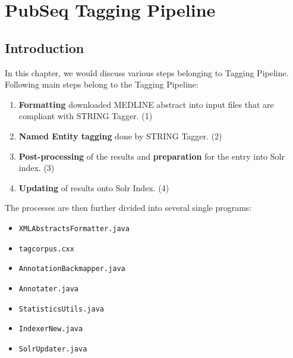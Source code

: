 
\chapter{PubSeq Tagging Pipeline} %

\label{Chapter4} %



\section{Introduction}

In this chapter, we would discuss various steps belonging to Tagging Pipeline. Following main steps belong to the Tagging Pipeline:

\begin{enumerate}
\item \textbf{Formatting} downloaded MEDLINE abstract into input files that are compliant with STRING  Tagger. \label{itm:TaggingStep1} (1)
\item \textbf{Named Entity tagging} done by STRING Tagger. \label{itm:TaggingStep2} (2)
\item \textbf{Post-processing} of the results and \textbf{preparation} for the entry into Solr index. \label{itm:TaggingStep3} (3)
\item \textbf{Updating} of results onto Solr Index. \label{itm:TaggingStep4} (4)
\end{enumerate}

The processes are then further divided into several single programs:

\begin{itemize}
\item \texttt{XMLAbstractsFormatter.java}
\item \texttt{tagcorpus.cxx}
\item \texttt{AnnotationBackmapper.java}
\item \texttt{Annotater.java}
\item \texttt{StatisticsUtils.java}
\item \texttt{IndexerNew.java}
\item \texttt{SolrUpdater.java}
\end{itemize}

